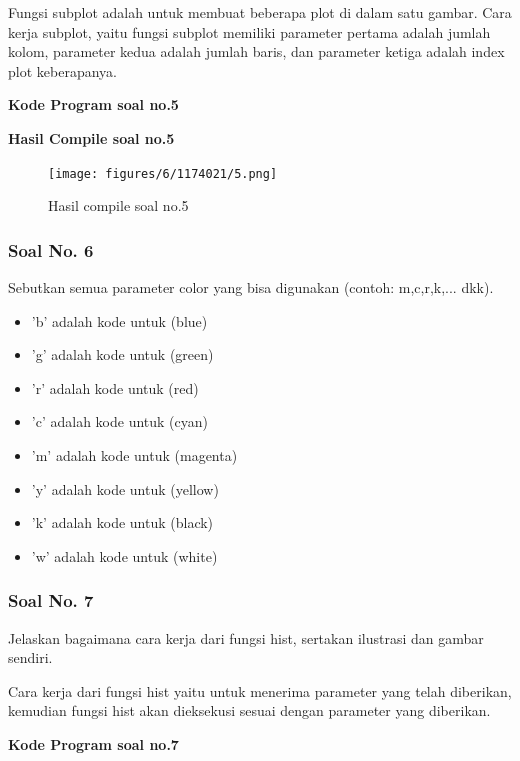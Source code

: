 \hfill \break
Fungsi subplot adalah untuk membuat beberapa plot di dalam satu gambar.
\hfill \break
Cara kerja subplot, yaitu fungsi subplot memiliki parameter pertama adalah jumlah kolom, parameter kedua adalah jumlah baris, dan parameter ketiga adalah index plot keberapanya.

\hfill \break
\textbf{Kode Program soal no.5}



\hfill \break
\textbf{Hasil Compile soal no.5}

\begin{figure}[H]
	\texttt{[image: figures/6/1174021/5.png]}
	\centering
	\caption{Hasil compile soal no.5}
\end{figure}

\subsubsection{Soal No. 6}
\hfill \break
Sebutkan semua parameter color yang bisa digunakan (contoh:  m,c,r,k,...  dkk).

\begin{itemize}
	\item 'b' adalah kode untuk (blue)
	\item 'g' adalah kode untuk (green)
	\item 'r' adalah kode untuk (red)
	\item 'c' adalah kode untuk (cyan)
	\item 'm' adalah kode untuk (magenta)
	\item 'y' adalah kode untuk (yellow)
	\item 'k' adalah kode untuk (black)
	\item 'w' adalah kode untuk (white)
\end{itemize}

\subsubsection{Soal No. 7}
\hfill \break
Jelaskan bagaimana cara kerja dari fungsi hist, sertakan ilustrasi dan gambar sendiri.

\hfill \break
Cara kerja dari fungsi hist yaitu untuk menerima parameter yang telah diberikan, kemudian fungsi hist akan dieksekusi sesuai dengan parameter yang diberikan.

\hfill \break
\textbf{Kode Program soal no.7}

